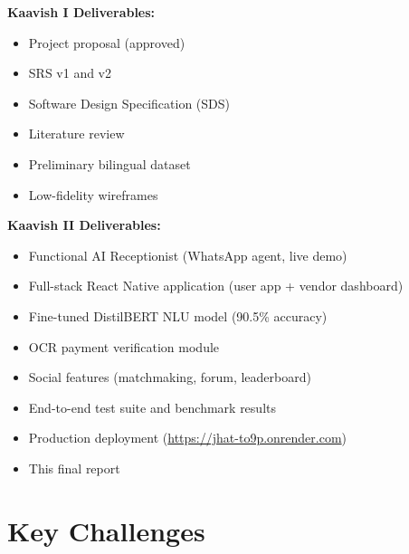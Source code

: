 \noindent\textbf{Kaavish I Deliverables:}
\begin{itemize}
  \item Project proposal (approved)
  \item SRS v1 and v2
  \item Software Design Specification (SDS)
  \item Literature review
  \item Preliminary bilingual dataset
  \item Low-fidelity wireframes
\end{itemize}

\noindent\textbf{Kaavish II Deliverables:}
\begin{itemize}
  \item Functional AI Receptionist (WhatsApp agent, live demo)
  \item Full-stack React Native application (user app + vendor dashboard)
  \item Fine-tuned DistilBERT NLU model (90.5\% accuracy)
  \item OCR payment verification module
  \item Social features (matchmaking, forum, leaderboard)
  \item End-to-end test suite and benchmark results
  \item Production deployment (\url{https://jhat-to9p.onrender.com})
  \item This final report
\end{itemize}

\section{Key Challenges}
\label{sec:intro-challenges}

